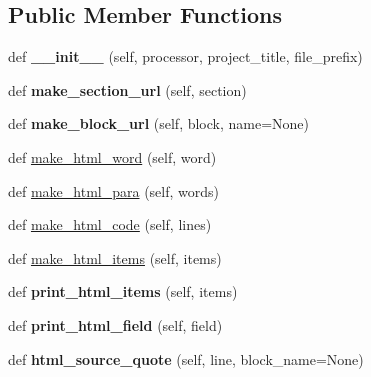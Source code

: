 \subsection*{Public Member Functions}
\begin{DoxyCompactItemize}
\item 
\mbox{\label{classtohtml_1_1_html_formatter_aa52f084d5be34256a5cd8e2c714dd979}} 
def {\bfseries \+\_\+\+\_\+init\+\_\+\+\_\+} (self, processor, project\+\_\+title, file\+\_\+prefix)
\item 
\mbox{\label{classtohtml_1_1_html_formatter_a5a9846bd3b63d0b2c19ea8753442cf76}} 
def {\bfseries make\+\_\+section\+\_\+url} (self, section)
\item 
\mbox{\label{classtohtml_1_1_html_formatter_abc19103fd2f7dd0571af9cf2b6cf9f5a}} 
def {\bfseries make\+\_\+block\+\_\+url} (self, block, name=None)
\item 
def \hyperlink{classtohtml_1_1_html_formatter_a7eeb95b937b988a88537e32ace23a65f}{make\+\_\+html\+\_\+word} (self, word)
\item 
def \hyperlink{classtohtml_1_1_html_formatter_a8c7fac47f3d089b2756287b0c4e6034f}{make\+\_\+html\+\_\+para} (self, words)
\item 
def \hyperlink{classtohtml_1_1_html_formatter_af449a521ac7ae4d1f01b7741d72b8116}{make\+\_\+html\+\_\+code} (self, lines)
\item 
def \hyperlink{classtohtml_1_1_html_formatter_ab39a6e0b6b849637aaea4a4b4ba0f0a6}{make\+\_\+html\+\_\+items} (self, items)
\item 
\mbox{\label{classtohtml_1_1_html_formatter_ae86bbfdfbc2a44c68ac0594ddb5cf144}} 
def {\bfseries print\+\_\+html\+\_\+items} (self, items)
\item 
\mbox{\label{classtohtml_1_1_html_formatter_a925a22a4be60ac142deb9fcc7940fc57}} 
def {\bfseries print\+\_\+html\+\_\+field} (self, field)
\item 
\mbox{\label{classtohtml_1_1_html_formatter_a844674ce2d1de46bf2d86b26aa607775}} 
def {\bfseries html\+\_\+source\+\_\+quote} (self, line, block\+\_\+name=None)
\item 

\end{DoxyCompactItemize}
